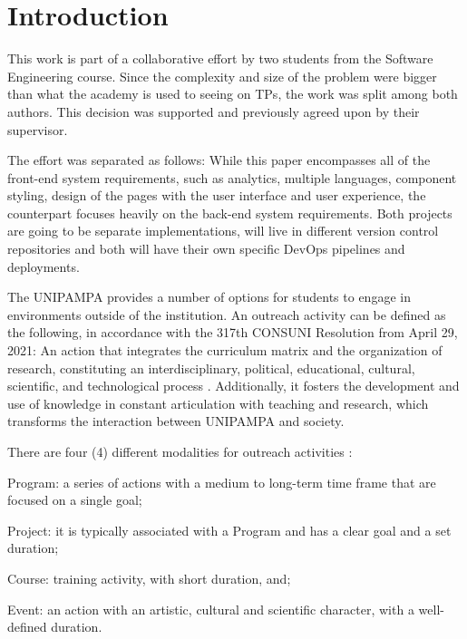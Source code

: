 \chapter{Introduction}\label{introduction}

This work is part of a collaborative effort by two students from the Software Engineering course. Since the complexity and size of the problem were bigger than what the academy is used to seeing on \acp{TP}, the work was split among both authors. This decision was supported and previously agreed upon by their supervisor.

The effort was separated as follows: While this paper encompasses all of the front-end system requirements, such as analytics, multiple languages, component styling, design of the pages with the user interface and user experience, the counterpart focuses heavily on the back-end system requirements. Both projects are going to be separate implementations, will live in different version control repositories and both will have their own specific DevOps pipelines and deployments.

The \acl{UNIPAMPA} provides a number of options for students to engage in environments outside of the institution. An outreach activity can be defined as the following, in accordance with the 317th CONSUNI Resolution from April 29, 2021: An action that integrates the curriculum matrix and the organization of research, constituting an interdisciplinary, political, educational, cultural, scientific, and technological process \cite{res317}. Additionally, it fosters the development and use of knowledge in constant articulation with teaching and research, which transforms the interaction between \ac{UNIPAMPA} and society.

There are four (4) different modalities for outreach activities \cite{res317}:
\begin{inparaenum}[(i)]
  \item Program: a series of actions with a medium to long-term time frame that are focused on a single goal;
  \item Project: it is typically associated with a Program and has a clear goal and a set duration;
  \item Course: training activity, with short duration, and;
  \item Event: an action with an artistic, cultural and scientific character, with a well-defined duration.
\end{inparaenum}

